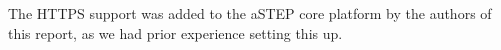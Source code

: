 The HTTPS support was added to the aSTEP core platform by the authors of this report, as we had prior experience setting this up.










